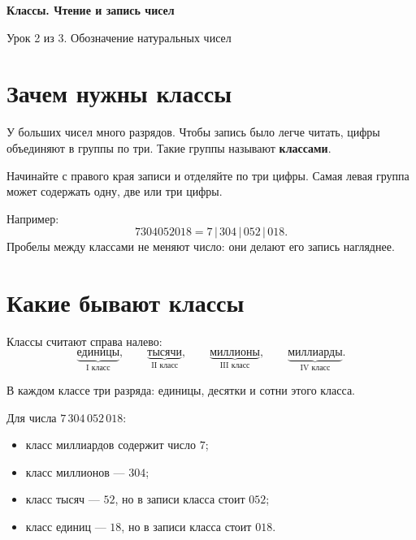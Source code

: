 
\begin{center}
  {\fontsize{25}{30}\selectfont\bfseries\sffamily\color{Primary}
    Классы. Чтение и запись чисел}

  \vspace{0.3em}

  {\large\sffamily\color{GrayText}
    Урок 2 из 3. Обозначение натуральных чисел}
\end{center}

\vspace{0.45em}

\section{Зачем нужны классы}

У больших чисел много разрядов. Чтобы запись было легче читать, цифры
объединяют в группы по три. Такие группы называют \textbf{классами}.

\splitclassesfigure

\begin{propertybox}
  Начинайте с правого края записи и отделяйте по три цифры. Самая левая
  группа может содержать одну, две или три цифры.
\end{propertybox}

Например:
\[
  7304052018=7\,|\,304\,|\,052\,|\,018.
\]
Пробелы между классами не меняют число: они делают его запись нагляднее.

\section{Какие бывают классы}

Классы считают справа налево:
\[
  \underbrace{\text{единицы}}_{\text{I класс}},\qquad
  \underbrace{\text{тысячи}}_{\text{II класс}},\qquad
  \underbrace{\text{миллионы}}_{\text{III класс}},\qquad
  \underbrace{\text{миллиарды}}_{\text{IV класс}}.
\]

В каждом классе три разряда: единицы, десятки и сотни этого класса.

\classtablefigure

Для числа \(7\,304\,052\,018\):
\begin{itemize}
  \item класс миллиардов содержит число \(7\);
  \item класс миллионов --- \(304\);
  \item класс тысяч --- \(52\), но в записи класса стоит \(052\);
  \item класс единиц --- \(18\), но в записи класса стоит \(018\).
\end{itemize}

